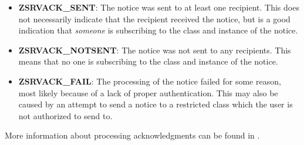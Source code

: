 \begin{itemize}
\item {\bf ZSRVACK_SENT}: The notice was sent to at least one
recipient.  This does not necessarily indicate that the recipient
received the notice, but is a good indication that {\em someone\/} is
subscribing to the class and instance of the notice.
\item {\bf ZSRVACK_NOTSENT}: The notice was not sent to any
recipients.  This means that no one is subscribing to the class and
instance of the notice.
\item {\bf ZSRVACK_FAIL}: The processing of the notice failed for
some reason, most likely because of a lack of proper authentication.
This may also be caused by an attempt to send a notice to a restricted
class which the user is not authorized to send to.
\end{itemize}

More information about processing acknowledgments can be found in
.
